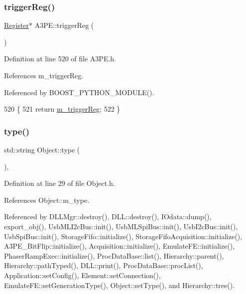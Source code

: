 \subsubsection{\texorpdfstring{trigger\+Reg()}{triggerReg()}}
{\footnotesize\ttfamily \hyperlink{classRegister}{Register}$\ast$ A3\+P\+E\+::trigger\+Reg (\begin{DoxyParamCaption}{ }\end{DoxyParamCaption})\hspace{0.3cm}{\ttfamily [inline]}}



Definition at line 520 of file A3\+P\+E.\+h.



References m\+\_\+trigger\+Reg.



Referenced by B\+O\+O\+S\+T\+\_\+\+P\+Y\+T\+H\+O\+N\+\_\+\+M\+O\+D\+U\+L\+E().


\begin{DoxyCode}
520                         \{
521     \textcolor{keywordflow}{return} \hyperlink{classA3PE_a750158ae488121ab7969452f061e678c}{m\_triggerReg};
522   \}
\end{DoxyCode}
\mbox{\label{classObject_a84f99f70f144a83e1582d1d0f84e4e62}} 
\subsubsection{\texorpdfstring{type()}{type()}}
{\footnotesize\ttfamily std\+::string Object\+::type (\begin{DoxyParamCaption}{ }\end{DoxyParamCaption})\hspace{0.3cm}{\ttfamily [inline]}, {\ttfamily [inherited]}}



Definition at line 29 of file Object.\+h.



References Object\+::m\+\_\+type.



Referenced by D\+L\+L\+Mgr\+::destroy(), D\+L\+L\+::destroy(), I\+Odata\+::dump(), export\+\_\+obj(), Usb\+M\+L\+I2c\+Bus\+::init(), Usb\+M\+L\+Spi\+Bus\+::init(), Usb\+I2c\+Bus\+::init(), Usb\+Spi\+Bus\+::init(), Storage\+Fifo\+::initialize(), Storage\+Fifo\+Acquisition\+::initialize(), A3\+P\+E\+\_\+\+Bit\+Flip\+::initialize(), Acquisition\+::initialize(), Emulate\+F\+E\+::initialize(), Phaser\+Ramp\+Exec\+::initialize(), Proc\+Data\+Base\+::list(), Hierarchy\+::parent(), Hierarchy\+::path\+Typed(), D\+L\+L\+::print(), Proc\+Data\+Base\+::proc\+List(), Application\+::set\+Config(), Element\+::set\+Connection(), Emulate\+F\+E\+::set\+Generation\+Type(), Object\+::set\+Type(), and Hierarchy\+::tree().


